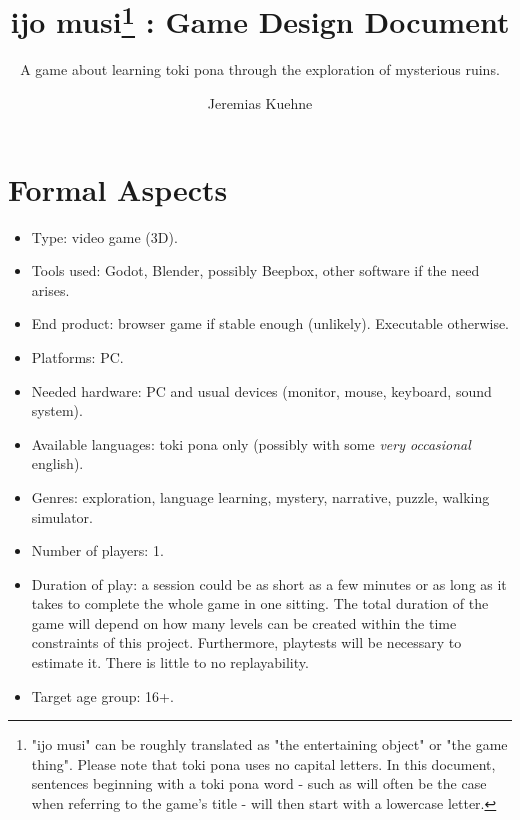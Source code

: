\documentclass{scrartcl}
\title{ijo musi\footnote{"ijo musi" can be roughly translated as "the entertaining object" or "the game thing". Please note that toki pona uses no capital letters. In this document, sentences beginning with a toki pona word - such as will often be the case when referring to the game's title - will then start with a lowercase letter.} : Game Design Document}
\subtitle{A game about learning toki pona through the exploration of mysterious ruins.}
\author{Jeremias Kuehne}
\begin{document}
	
	\maketitle
	\section{Formal Aspects}
		\begin{itemize}
			\item Type: video game (3D).
			\item Tools used: Godot, Blender, possibly Beepbox, other software if the need arises.
			\item End product: browser game if stable enough (unlikely). Executable otherwise.
			\item Platforms: PC.
			\item Needed hardware: PC and usual devices (monitor, mouse, keyboard, sound system).
			\item Available languages: toki pona only (possibly with some \textit{very occasional} english).
			\item Genres: exploration, language learning, mystery, narrative, puzzle, walking simulator.
			\item Number of players: 1.
			\item Duration of play: a session could be as short as a few minutes or as long as it takes to complete the whole game in one sitting. The total duration of the game will depend on how many levels can be created within the time constraints of this project. Furthermore, playtests will be necessary to estimate it. There is little to no replayability.
			\item Target age group: 16+.
		\end{itemize}
\end{document}
